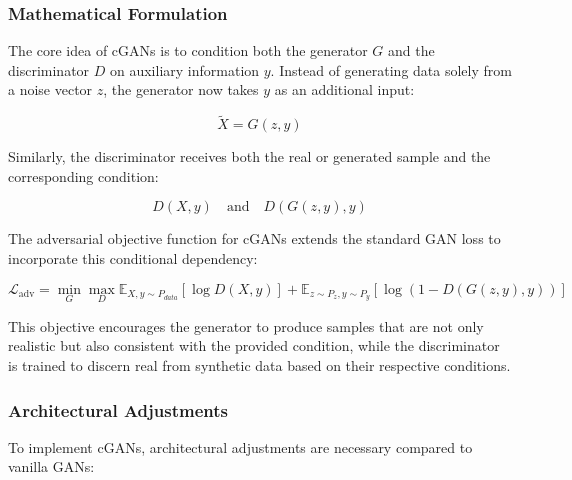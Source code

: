 \subsubsection{Mathematical Formulation}
\label{theoretical_cgan_math}
The core idea of cGANs is to condition both the generator \(G\) and the discriminator \(D\) on auxiliary information \(y\). Instead of generating data solely from a noise vector \(z\), the generator now takes \(y\) as an additional input:

\begin{equation}
\tilde{X} = G(z, y)
\end{equation}

\noindent
Similarly, the discriminator receives both the real or generated sample and the corresponding condition:

\begin{equation}
D(X, y) \quad \text{and} \quad D(G(z, y), y)
\end{equation}

\noindent
The adversarial objective function for cGANs extends the standard GAN loss to incorporate this conditional dependency:

\begin{equation}\label{theory_gan_cond_formula}
\mathcal{L}_{\text{adv}} = \min_G \max_D \mathbb{E}_{X, y \sim P_{data}} [\log D(X, y)] + \mathbb{E}_{z \sim P_z, y \sim P_y} [\log (1 - D(G(z, y), y))]
\end{equation}

\noindent
This objective encourages the generator to produce samples that are not only realistic but also consistent with the provided condition, while the discriminator is trained to discern real from synthetic data based on their respective conditions.

\subsubsection{Architectural Adjustments}
\label{theory_cgan_architecture}
To implement cGANs, architectural adjustments are necessary compared to vanilla GANs:


